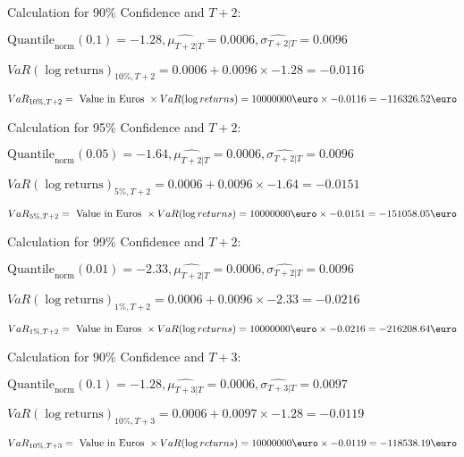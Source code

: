 Calculation for 90\% Confidence and $T+2$:

\indent\indent $\text{Quantile}_\text{norm}(0.1) = -1.28,\hat{\mu_{T+2|T}} = 0.0006, \hat{\sigma_{T+2|T}} = 0.0096$

\indent\indent $VaR(\log \text{returns})_{10\%, T + 2} = 0.0006 + 0.0096\times-1.28 = -0.0116$

\indent\indent $VaR_{10\%, T + 2} = \text{ Value in Euros } \times VaR(\log returns) = 10 000 000 \text{\euro} \times-0.0116 = -116326.52 \text{\euro}$\newline




Calculation for 95\% Confidence and $T+2$:

\indent\indent $\text{Quantile}_\text{norm}(0.05) = -1.64,\hat{\mu_{T+2|T}} = 0.0006, \hat{\sigma_{T+2|T}} = 0.0096$

\indent\indent $VaR(\log \text{returns})_{5\%, T + 2} = 0.0006 + 0.0096\times-1.64 = -0.0151$

\indent\indent $VaR_{5\%, T + 2} = \text{ Value in Euros } \times VaR(\log returns) = 10 000 000 \text{\euro} \times-0.0151 = -151058.05 \text{\euro}$\newline




Calculation for 99\% Confidence and $T+2$:

\indent\indent $\text{Quantile}_\text{norm}(0.01) = -2.33,\hat{\mu_{T+2|T}} = 0.0006, \hat{\sigma_{T+2|T}} = 0.0096$

\indent\indent $VaR(\log \text{returns})_{1\%, T + 2} = 0.0006 + 0.0096\times-2.33 = -0.0216$

\indent\indent $VaR_{1\%, T + 2} = \text{ Value in Euros } \times VaR(\log returns) = 10 000 000 \text{\euro} \times-0.0216 = -216208.64 \text{\euro}$\newline




Calculation for 90\% Confidence and $T+3$:

\indent\indent $\text{Quantile}_\text{norm}(0.1) = -1.28,\hat{\mu_{T+3|T}} = 0.0006, \hat{\sigma_{T+3|T}} = 0.0097$

\indent\indent $VaR(\log \text{returns})_{10\%, T + 3} = 0.0006 + 0.0097\times-1.28 = -0.0119$

\indent\indent $VaR_{10\%, T + 3} = \text{ Value in Euros } \times VaR(\log returns) = 10 000 000 \text{\euro} \times-0.0119 = -118538.19 \text{\euro}$\newline




